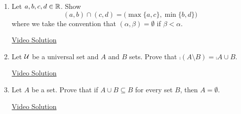 \begin{enumerate}
	\item Let $a,b,c,d \in \mathbb{R}$. Show
	\[
		(a,b)\cap (c,d)=\bigl(\max\{a,c\},\min\{b,d\}\bigr)
	\]
	where we take the convention that $(\alpha,\beta)=\emptyset$ if $\beta<\alpha$.

	\href{https://youtu.be/zBbGQv8ghsY}{Video Solution}


	\item Let $\mathcal{U}$ be a universal set and $A$ and $B$ sets. Prove that $\comp{(A\setminus B)} = \comp{A}\cup B$.

	\href{https://youtu.be/kZ6nheFBrM8}{Video Solution}


	\item Let $A$ be a set. Prove that if $A\cup B\subseteq B$ for every set $B$, then $A=\emptyset$.

	\href{https://youtu.be/CfzvERcv4xc}{Video Solution}
\end{enumerate}